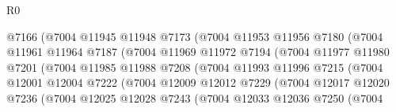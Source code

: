 \begin{lexlean}{R0}
\begin{coremodule}
                                  @7166
                                  (@7004
                                    @11945
                                    @11948
                                    @7173
                                    (@7004
                                      @11953
                                      @11956
                                      @7180
                                      (@7004
                                        @11961
                                        @11964
                                        @7187
                                        (@7004
                                          @11969
                                          @11972
                                          @7194
                                          (@7004
                                            @11977
                                            @11980
                                            @7201
                                            (@7004
                                              @11985
                                              @11988
                                              @7208
                                              (@7004
                                                @11993
                                                @11996
                                                @7215
                                                (@7004
                                                  @12001
                                                  @12004
                                                  @7222
                                                  (@7004
                                                    @12009
                                                    @12012
                                                    @7229
                                                    (@7004
                                                      @12017
                                                      @12020
                                                      @7236
                                                      (@7004
                                                        @12025
                                                        @12028
                                                        @7243
                                                        (@7004
                                                          @12033
                                                          @12036
                                                          @7250
                                                          (@7004

\end{coremodule}
\end{lexlean}
